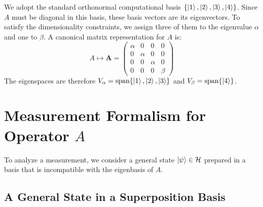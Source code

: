 \documentclass[11pt,a4paper]{article}
\begin{document}
We adopt the standard orthonormal computational basis $\{\ket{1}, \ket{2}, \ket{3}, \ket{4}\}$. Since $A$ must be diagonal in this basis, these basis vectors are its eigenvectors. To satisfy the dimensionality constraints, we assign three of them to the eigenvalue $\alpha$ and one to $\beta$. A canonical matrix representation for $A$ is:
$$
A \mapsto \mathbf{A} =
\begin{pmatrix}
\alpha & 0 & 0 & 0 \\
0 & \alpha & 0 & 0 \\
0 & 0 & \alpha & 0 \\
0 & 0 & 0 & \beta
\end{pmatrix}
$$
The eigenspaces are therefore $V_\alpha = \text{span}\{\ket{1}, \ket{2}, \ket{3}\}$ and $V_\beta = \text{span}\{\ket{4}\}$.

\section{Measurement Formalism for Operator \texorpdfstring{$A$}{A}}

To analyze a measurement, we consider a general state $\ket{\psi} \in \mathcal{H}$ prepared in a basis that is incompatible with the eigenbasis of $A$.

\subsection{A General State in a Superposition Basis}
\end{document}
